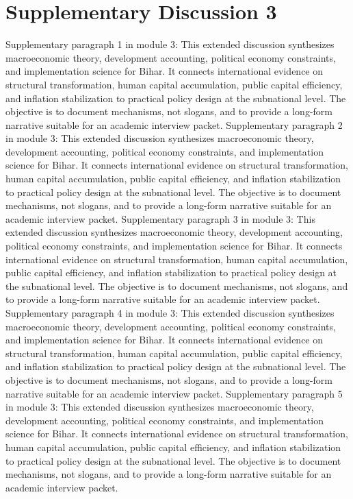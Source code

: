 \documentclass[preprint,12pt]{elsarticle}
\begin{document}
\section{Supplementary Discussion 3}
Supplementary paragraph 1 in module 3: This extended discussion synthesizes macroeconomic theory, development accounting, political economy constraints, and implementation science for Bihar. It connects international evidence on structural transformation, human capital accumulation, public capital efficiency, and inflation stabilization to practical policy design at the subnational level. The objective is to document mechanisms, not slogans, and to provide a long-form narrative suitable for an academic interview packet.
Supplementary paragraph 2 in module 3: This extended discussion synthesizes macroeconomic theory, development accounting, political economy constraints, and implementation science for Bihar. It connects international evidence on structural transformation, human capital accumulation, public capital efficiency, and inflation stabilization to practical policy design at the subnational level. The objective is to document mechanisms, not slogans, and to provide a long-form narrative suitable for an academic interview packet.
Supplementary paragraph 3 in module 3: This extended discussion synthesizes macroeconomic theory, development accounting, political economy constraints, and implementation science for Bihar. It connects international evidence on structural transformation, human capital accumulation, public capital efficiency, and inflation stabilization to practical policy design at the subnational level. The objective is to document mechanisms, not slogans, and to provide a long-form narrative suitable for an academic interview packet.
Supplementary paragraph 4 in module 3: This extended discussion synthesizes macroeconomic theory, development accounting, political economy constraints, and implementation science for Bihar. It connects international evidence on structural transformation, human capital accumulation, public capital efficiency, and inflation stabilization to practical policy design at the subnational level. The objective is to document mechanisms, not slogans, and to provide a long-form narrative suitable for an academic interview packet.
Supplementary paragraph 5 in module 3: This extended discussion synthesizes macroeconomic theory, development accounting, political economy constraints, and implementation science for Bihar. It connects international evidence on structural transformation, human capital accumulation, public capital efficiency, and inflation stabilization to practical policy design at the subnational level. The objective is to document mechanisms, not slogans, and to provide a long-form narrative suitable for an academic interview packet.
\end{document}
